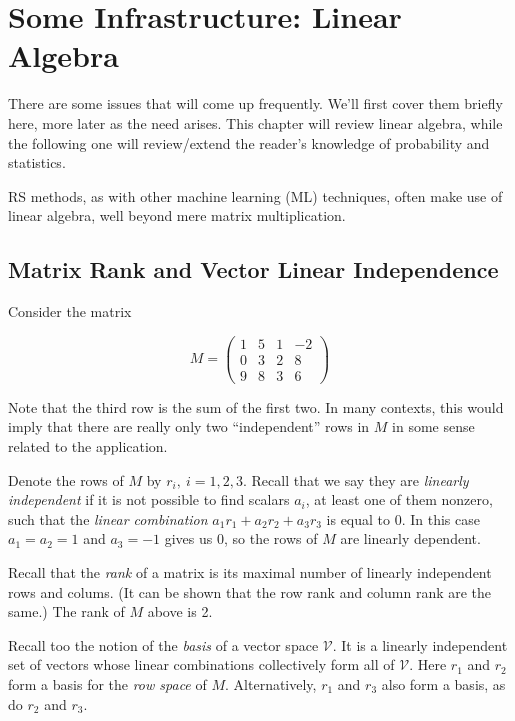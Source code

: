 \chapter{Some Infrastructure: Linear Algebra} 
\label{chap:linalg}   

There are some issues that will come up frequently.  We'll first cover them
briefly here, more later as the need arises.  This chapter will review
linear algebra, while the following one will review/extend the reader's
knowledge of probability and statistics.

RS methods, as with other machine learning (ML) techniques, often make
use of linear algebra, well beyond mere matrix multiplication. 

\section{Matrix Rank and Vector Linear Independence}

Consider the matrix

\begin{equation}
\label{rankex1}
M = 
\left (
\begin{array}{rrrr}
1 & 5 & 1 & -2\\
0 & 3 & 2 & 8\\
9 & 8 & 3 & 6 
\end{array}
\right )
\end{equation}

Note that the third row is the sum of the first two.  In many contexts,
this would imply that there are really only two ``independent'' rows in
$M$ in some sense related to the application.  

Denote the rows of $M$ by $r_i, ~ i = 1,2,3$.  Recall that we say they
are \textit{linearly independent} if it is not possible to find scalars
$a_i$, at least one of them nonzero, such that the \textit{linear
combination} $a_1 r_1 + a_2 r_2 + a_3 r_3$ is equal to 0.  In this case
$a_1 = a_2 = 1$ and $a_3 = -1$ gives us 0, so the rows of $M$ are
linearly dependent.

Recall that the \textit{rank} of a matrix is its maximal number of
linearly independent rows and colums.  (It can be shown that the row
rank and column rank are the same.)  The rank of $M$ above is 2.

Recall too the notion of the \textit{basis} of a vector space
$\mathcal{V}$.  It is a linearly independent set of vectors whose linear
combinations collectively form all of $\mathcal{V}$.  Here  $r_1$ and
$r_2$ form a basis for the \textit{row space} of $M$.  Alternatively,
$r_1$ and $r_3$ also form a basis, as do $r_2$ and $r_3$.

